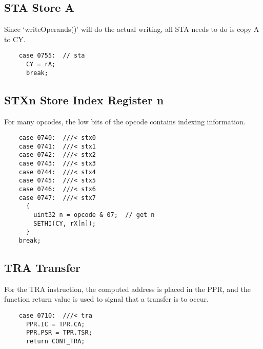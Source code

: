 \documentclass[notitlepage]{report}
\begin{document}
\subsection{STA Store A}

Since `writeOperands()' will do the actual writing, all STA needs to
do is copy A to CY.

\begin{verbatim}
    case 0755:  // sta
      CY = rA;
      break;
\end{verbatim}

\subsection{STXn Store Index Register n}

For many opcodes, the low bits of the opcode contains indexing 
information.

\begin{verbatim}
    case 0740:  ///< stx0
    case 0741:  ///< stx1
    case 0742:  ///< stx2
    case 0743:  ///< stx3
    case 0744:  ///< stx4
    case 0745:  ///< stx5
    case 0746:  ///< stx6
    case 0747:  ///< stx7
      {
        uint32 n = opcode & 07;  // get n
        SETHI(CY, rX[n]);
      }
    break;
\end{verbatim}

\subsection {TRA Transfer}

For the TRA instruction, the computed address is placed in the PPR, and the
function return value is used to signal that a transfer is to occur.

\begin{verbatim}
    case 0710:  ///< tra
      PPR.IC = TPR.CA;
      PPR.PSR = TPR.TSR;
      return CONT_TRA;
\end{verbatim}
\end{document}
